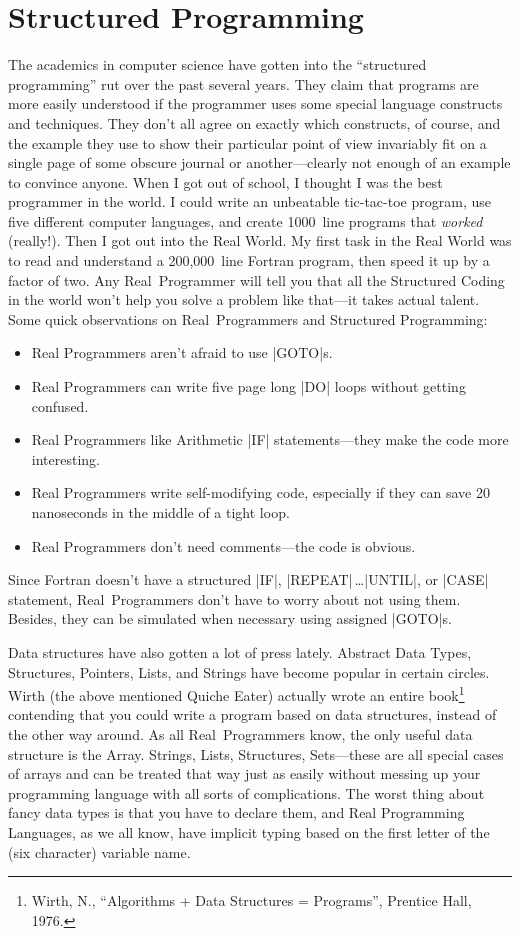 \documentclass[10pt,letterpaper]{article}
\begin{document}
\section*{Structured Programming}
The academics in computer science have gotten into the ``structured
programming'' rut over the past several years. They claim that programs
are more easily understood if the programmer uses some special
language constructs and techniques. They don't all agree on exactly
which constructs, of course, and the example they use to show their
particular point of view invariably fit on a single page of some
obscure journal or another---clearly not enough of an example to
convince anyone. When I got out of school, I thought I was the best
programmer in the world. I could write an unbeatable tic-tac-toe
program, use five different computer languages, and create 1000~line
programs that \emph{worked} (really!). Then I got out into the Real World. My
first task in the Real World was to read and understand a 200,000~line
Fortran program, then speed it up by a factor of two. Any Real~Programmer
will tell you that all the Structured Coding in the world
won't help you solve a problem like that---it takes actual
talent. Some quick observations on Real~Programmers and Structured
Programming:
\begin{itemize}
\item Real Programmers aren't afraid to use |GOTO|s.
\item Real Programmers can write five page long |DO| loops without getting confused.
\item Real Programmers like Arithmetic |IF| statements---they make the code more interesting.
\item Real Programmers write self-modifying code, especially if they can save 20 nanoseconds in the middle of a tight loop.
\item Real Programmers don't need comments---the code is obvious.
\end{itemize}
Since Fortran doesn't have a structured |IF|, |REPEAT|\,\ldots|UNTIL|,
or |CASE| statement, Real~Programmers don't have to worry about not using
them. Besides, they can be simulated when necessary using assigned
|GOTO|s.

Data structures have also gotten a lot of press lately. Abstract Data
Types, Structures, Pointers, Lists, and Strings have become popular in
certain circles. Wirth (the above mentioned Quiche Eater) actually
wrote an entire book\footnote{Wirth, N., ``Algorithms + Data Structures = Programs'', Prentice Hall, 1976.}
contending that you could write a program
based on data structures, instead of the other way around. As all
Real~Programmers know, the only useful data structure is the
Array. Strings, Lists, Structures, Sets---these are all special cases
of arrays and can be treated that way just as easily without messing
up your programming language with all sorts of complications. The
worst thing about fancy data types is that you have to declare them,
and Real Programming Languages, as we all know, have implicit typing
based on the first letter of the (six character) variable name.
\end{document}
